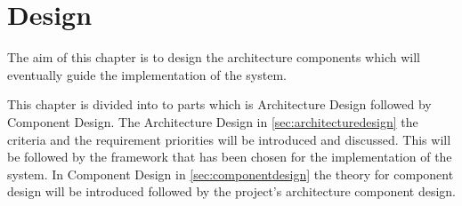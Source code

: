 \chapter{Design}
The aim of this chapter is to design the architecture components which will eventually guide the implementation of the system.

This chapter is divided into to parts which is Architecture Design followed by Component Design.
The Architecture Design in \cref{sec:architecturedesign} the criteria and the requirement priorities will be introduced and discussed.
This will be followed by the framework that has been chosen for the implementation of the system.
In Component Design in \cref{sec:componentdesign} the theory for component design will be introduced followed by the project's architecture component design.



